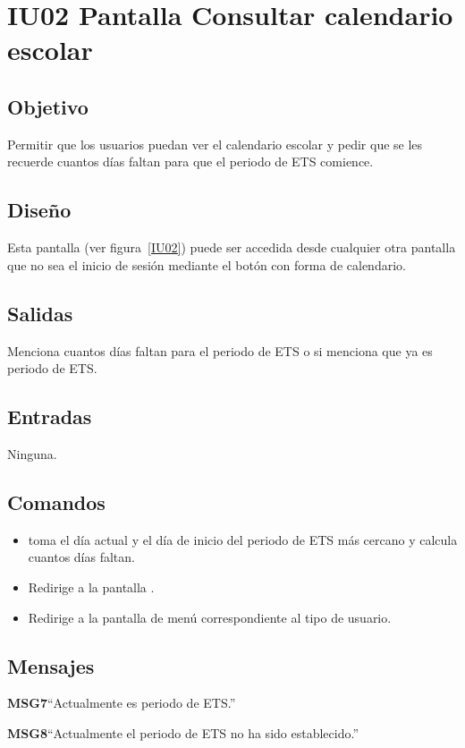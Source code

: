 
\section{IU02 Pantalla Consultar calendario escolar}

\subsection{Objetivo}
Permitir que los usuarios puedan ver el calendario escolar y pedir que se les recuerde cuantos días faltan para que el periodo de ETS comience.
\subsection{Diseño}
    Esta pantalla  (ver figura~\ref{IU02}) puede ser accedida desde cualquier otra pantalla que no sea el inicio de sesión mediante el botón con forma de calendario.



\subsection{Salidas}

    Menciona cuantos días faltan para el periodo de ETS o si menciona que ya es periodo de ETS.

\subsection{Entradas}
   Ninguna.

\subsection{Comandos}
\begin{itemize}
    \item {} toma el día actual y el día de inicio del periodo de ETS más cercano y calcula cuantos días faltan.
    \item {} Redirige a la pantalla .
    \item {} Redirige a la pantalla de menú correspondiente al tipo de usuario.
\end{itemize}

\subsection{Mensajes}
     
\begin{Citemize}
    \item {\bf MSG7}{``Actualmente es periodo de ETS.''}

    \item {\bf MSG8}{``Actualmente el periodo de ETS no ha sido establecido.''}
\end{Citemize}

